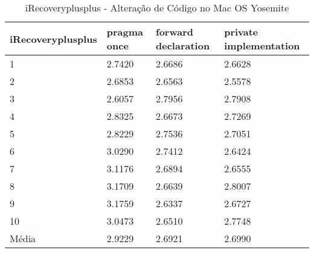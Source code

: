 \begin{table}[!h]
\centering
\caption{iRecoveryplusplus - Alteração de Código no Mac OS Yosemite}
\label{tab:alteracao_de_codigo:mac:irecovery}
\begin{tabular}{llll}
\textbf{iRecoveryplusplus} & \textbf{pragma once} & \textbf{forward declaration} & \textbf{private implementation}   \\ \toprule
1                                    & 2.7420 & 2.6686 & 2.6628 \\ 
2                                    & 2.6853 & 2.6563 & 2.5578 \\ 
3                                    & 2.6057 & 2.7956 & 2.7908 \\ 
4                                    & 2.8325 & 2.6673 & 2.7269 \\ 
5                                    & 2.8229 & 2.7536 & 2.7051 \\ 
6                                    & 3.0290 & 2.7412 & 2.6424 \\ 
7                                    & 3.1176 & 2.6894 & 2.6555 \\ 
8                                    & 3.1709 & 2.6639 & 2.8007 \\ 
9                                    & 3.1759 & 2.6337 & 2.6727 \\ 
10                                   & 3.0473 & 2.6510 & 2.7748 \\ \bottomrule
Média                                & 2.9229 & 2.6921 & 2.6990 \\ 
\end{tabular}
\end{table}

